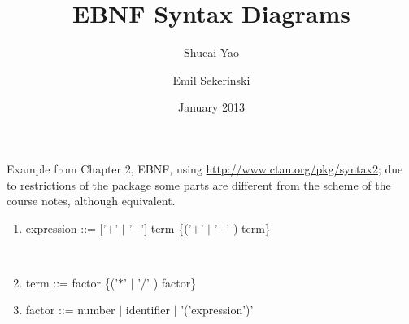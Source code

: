 \documentclass{article}
\begin{document}
\title{EBNF Syntax Diagrams}
\author{Shucai Yao \and Emil Sekerinski}
\date{January 2013}
\maketitle

\noindent Example from Chapter 2, EBNF, using \url{http://www.ctan.org/pkg/syntax2}; due to restrictions of the package some parts are different from the scheme of the course notes, although equivalent.
\begin{enumerate}
\item{expression ::= ['$+$' $\mid$ '$-$'] term \{('$+$' $\mid$ '$-$' ) term\}}

\begin{Syntaxdiagramm}%
{\begin{Alternativen}%
	{\TerSym{$+$}}%
	{\TerSym{$-$}}%
	{\Leer}\\%
	\end{Alternativen}%
}%
\Leer%
%
	  {\TerSym{$-$}}%
\end{Syntaxdiagramm}%

\item{term ::= factor \{('$*$' $\mid$ '$/$' ) factor\}}

\begin{Syntaxdiagramm}%
%
	  {\TerSym{$/$}}%
\end{Syntaxdiagramm}%

\item{factor ::= number $\mid$ identifier  $\mid$ '('expression')'}

\begin{Syntaxdiagramm}%
  \begin{Alternativen}
	 {}%
	 {\TerSym{(}%
	  \TerSymR{)}%
	 }%
	 \\%
  \end{Alternativen}
\end{Syntaxdiagramm}

\begin{Syntaxdiagramm}%
{\begin{Alternative}
	{
	\TerSym{(}%
	\TerSymR{)}%
	}
	{\begin{Alternative}
	{}%
	{}%
	\end{Alternative}
	}
	\end{Alternative}}%
\end{Syntaxdiagramm}
\end{enumerate}
\end{document}
